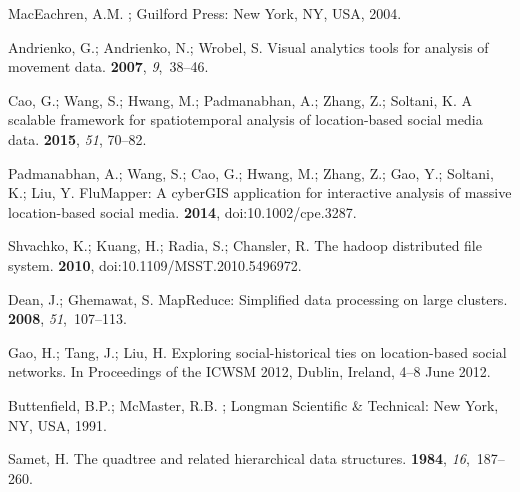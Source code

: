 \documentclass[ijgi,article,accept,moreauthors,pdftex,10pt,a4paper]{mdpi}
\theoremstyle{mdpi}
\newcounter{ex}
\newcounter{re}
\theoremstyle{mdpidefinition}
\begin{document}
\begin{thebibliography}{-------}
MacEachren, A.M.
;
  Guilford Press: New York, NY, USA, 2004.

Andrienko, G.; Andrienko, N.; Wrobel, S.
\newblock Visual analytics tools for analysis of movement data.
 {\bf 2007}, {\em 9},~38--46.

Cao, G.; Wang, S.; Hwang, M.; Padmanabhan, A.; Zhang, Z.; Soltani, K.
\newblock A scalable framework for spatiotemporal analysis of location-based
  social media data.
 {\bf 2015}, {\em 51}, 70--82.

Padmanabhan, A.; Wang, S.; Cao, G.; Hwang, M.; Zhang, Z.; Gao, Y.; Soltani, K.;
  Liu, Y.
\newblock FluMapper: A cyberGIS application for interactive analysis of massive
  location-based social media.
 {\bf
  2014}, doi:10.1002/cpe.3287.

Shvachko, K.; Kuang, H.; Radia, S.; Chansler, R.
\newblock The hadoop distributed file system.
  {\bf 2010}, doi:10.1109/MSST.2010.5496972.


Dean, J.; Ghemawat, S.
\newblock MapReduce: Simplified data processing on large clusters.
 {\bf 2008}, {\em 51},~107--113.


Gao, H.; Tang, J.; Liu, H.
\newblock Exploring social-historical ties on location-based social networks.
\newblock In Proceedings of the ICWSM 2012, Dublin, Ireland, 4--8 June 2012.

Buttenfield, B.P.; McMaster, R.B.
;
  Longman Scientific \& Technical: New York, NY, USA, 1991.

Samet, H.
\newblock The quadtree and related hierarchical data structures.
 {\bf 1984}, {\em 16},~187--260.


\end{thebibliography}
\end{document}
